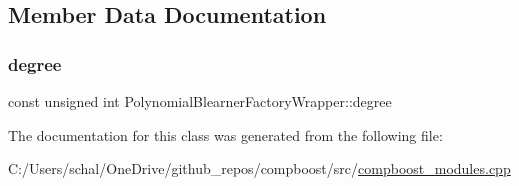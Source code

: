 \subsection{Member Data Documentation}
\mbox{\label{class_polynomial_blearner_factory_wrapper_aae00b359ac0ee8cfefb99ddfc5192fa6}} 
\subsubsection{\texorpdfstring{degree}{degree}}
{\footnotesize\ttfamily const unsigned int Polynomial\+Blearner\+Factory\+Wrapper\+::degree\hspace{0.3cm}{\ttfamily [private]}}



The documentation for this class was generated from the following file\+:\begin{DoxyCompactItemize}
\item 
C\+:/\+Users/schal/\+One\+Drive/github\+\_\+repos/compboost/src/\mbox{\hyperlink{compboost__modules_8cpp}{compboost\+\_\+modules.\+cpp}}\end{DoxyCompactItemize}
